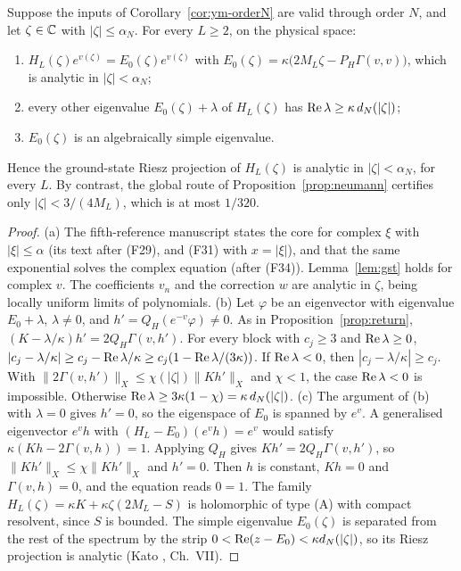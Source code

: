 \begin{proposition}\label{prop:complexgap}
Suppose the inputs of Corollary~\ref{cor:ym-orderN} are valid through order $N$, and let $\zeta\in\mathbb{C}$ with $|\zeta|\le\alpha_N$. For every $L\ge2$, on the physical space:
\begin{enumerate}[label=(\alph*)]
\item $H_L(\zeta)e^{v(\zeta)}=E_0(\zeta)e^{v(\zeta)}$ with $E_0(\zeta)=\kappa\bigl(2M_L\zeta-P_H\Gamma(v,v)\bigr)$, which is analytic in $|\zeta|<\alpha_N$;
\item every other eigenvalue $E_0(\zeta)+\lambda$ of $H_L(\zeta)$ has $\operatorname{Re}\lambda\ge\kappa\,d_N(|\zeta|)$;
\item $E_0(\zeta)$ is an algebraically simple eigenvalue.
\end{enumerate}
Hence the ground-state Riesz projection of $H_L(\zeta)$ is analytic in $|\zeta|<\alpha_N$, for every $L$. By contrast, the global route of Proposition~\ref{prop:neumann} certifies only $|\zeta|<3/(4M_L)$, which is at most $1/320$.
\end{proposition}
\begin{proof}
(a) The fifth-reference manuscript states the core for complex $\xi$ with $|\xi|\le\alpha$ (its text after (F29), and (F31) with $x=|\xi|$), and that the same exponential solves the complex equation (after (F34)). Lemma~\ref{lem:gst} holds for complex $v$. The coefficients $v_n$ and the correction $w$ are analytic in $\zeta$, being locally uniform limits of polynomials.
(b) Let $\varphi$ be an eigenvector with eigenvalue $E_0+\lambda$, $\lambda\neq0$, and $h'=Q_H(e^{-v}\varphi)\neq0$. As in Proposition~\ref{prop:return}, $(K-\lambda/\kappa)h'=2Q_H\Gamma(v,h')$. For every block with $c_j\ge3$ and $\operatorname{Re}\lambda\ge0$, $|c_j-\lambda/\kappa|\ge c_j-\operatorname{Re}\lambda/\kappa\ge c_j(1-\operatorname{Re}\lambda/(3\kappa))$. If $\operatorname{Re}\lambda<0$, then $|c_j-\lambda/\kappa|\ge c_j$. With $\|2\Gamma(v,h')\|_X\le\chi(|\zeta|)\|Kh'\|_X$ and $\chi<1$, the case $\operatorname{Re}\lambda<0$ is impossible. Otherwise $\operatorname{Re}\lambda\ge3\kappa(1-\chi)=\kappa\,d_N(|\zeta|)$.
(c) The argument of (b) with $\lambda=0$ gives $h'=0$, so the eigenspace of $E_0$ is spanned by $e^v$. A generalised eigenvector $e^vh$ with $(H_L-E_0)(e^vh)=e^v$ would satisfy $\kappa(Kh-2\Gamma(v,h))=1$. Applying $Q_H$ gives $Kh'=2Q_H\Gamma(v,h')$, so $\|Kh'\|_X\le\chi\|Kh'\|_X$ and $h'=0$. Then $h$ is constant, $Kh=0$ and $\Gamma(v,h)=0$, and the equation reads $0=1$.
The family $H_L(\zeta)=\kappa K+\kappa\zeta(2M_L-S)$ is holomorphic of type (A) with compact resolvent, since $S$ is bounded. The simple eigenvalue $E_0(\zeta)$ is separated from the rest of the spectrum by the strip $0<\operatorname{Re}(z-E_0)<\kappa d_N(|\zeta|)$, so its Riesz projection is analytic (Kato \cite{Kato}, Ch.~VII).
\end{proof}

